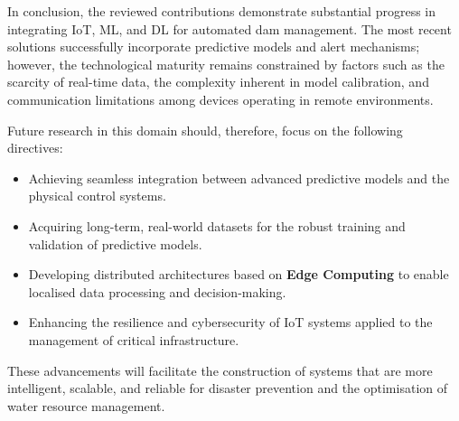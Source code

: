 In conclusion, the reviewed contributions demonstrate substantial progress in integrating IoT, ML, and DL for automated dam management. The most recent solutions successfully incorporate predictive models and alert mechanisms; however, the technological maturity remains constrained by factors such as the scarcity of real-time data, the complexity inherent in model calibration, and communication limitations among devices operating in remote environments.

Future research in this domain should, therefore, focus on the following directives:
\begin{itemize}
\item Achieving seamless integration between advanced predictive models and the physical control systems.
\item Acquiring long-term, real-world datasets for the robust training and validation of predictive models.
\item Developing distributed architectures based on \textbf{Edge Computing} to enable localised data processing and decision-making.
\item Enhancing the resilience and cybersecurity of IoT systems applied to the management of critical infrastructure.
\end{itemize}

These advancements will facilitate the construction of systems that are more intelligent, scalable, and reliable for disaster prevention and the optimisation of water resource management.
